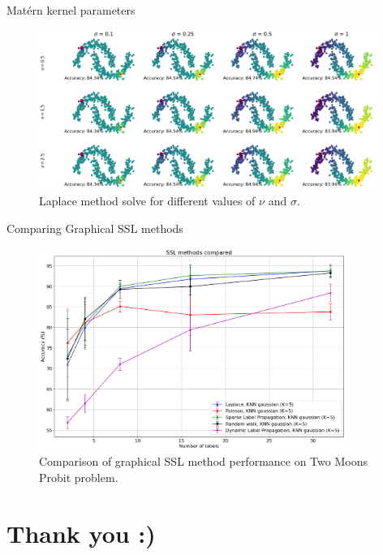 \documentclass[9pt]{beamer}
\begin{document}

\begin{frame}{Matérn kernel parameters}
  \begin{figure}[h!]
    \centering
    \includegraphics[width=11cm]{laplace_cv.png} %
    \caption{Laplace method solve for different values of $\nu$ and $\sigma$.}
  \end{figure}
\end{frame}


\begin{frame}{Comparing Graphical SSL methods}
  
\begin{figure}[h!]
  \centering
  \includegraphics[width=10cm]{ssl_methods_comp.png} %
  \caption{Comparison of graphical SSL method performance on Two Moons Probit problem.}
\end{figure}

\end{frame}


\section{Thank you :)}
\end{document}
